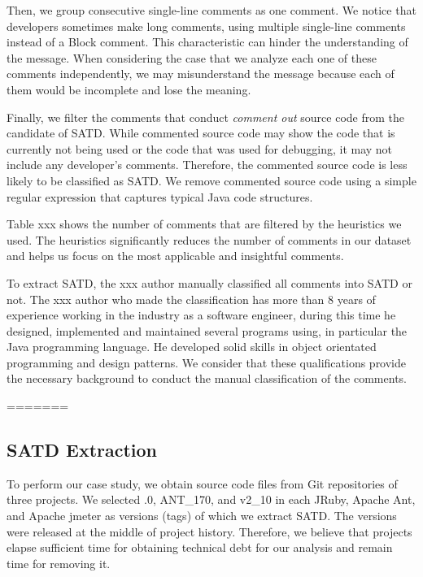 \documentclass[conference]{IEEEtran}
\begin{document}
Then, we group consecutive single-line comments as one comment. We notice that developers sometimes make long comments, using multiple single-line comments instead of a Block comment. This characteristic can hinder the understanding of the message. When considering the case that we analyze each one of these comments independently, we may misunderstand the message because each of them would be incomplete and lose the meaning.

Finally, we filter the comments that conduct {\it comment out} source code from the candidate of SATD. While commented source code may show the code that is currently not being used or the code that was used for debugging, it may not include any developer's comments. Therefore, the commented source code is less likely to be classified as SATD. We remove commented source code using a simple regular expression that captures typical Java code structures.

Table xxx shows the number of comments that are filtered by the heuristics we used. The heuristics significantly reduces the number of comments in our dataset and helps us focus on the most applicable and insightful comments. 


To extract SATD, the xxx author manually classified all comments into SATD or not.
The xxx author who made the classification has more than 8 years of experience working in the industry as a software engineer, during this time he designed, implemented and maintained several programs using, in particular the Java programming language. He developed solid skills in object orientated programming and design patterns. We consider that these qualifications provide the necessary background to conduct the manual classification of the comments.

=======


\subsection{SATD Extraction}
To perform our case study, we obtain source code files from Git repositories of three projects. We selected {.0}, {\sc ANT\_170}, and {\sc v2\_10} in each JRuby, Apache Ant, and Apache jmeter as versions (tags) of which we extract SATD. The versions were released at the middle of project history. Therefore, we believe that projects elapse sufficient time for obtaining technical debt for our analysis and remain time for removing it.
\end{document}
